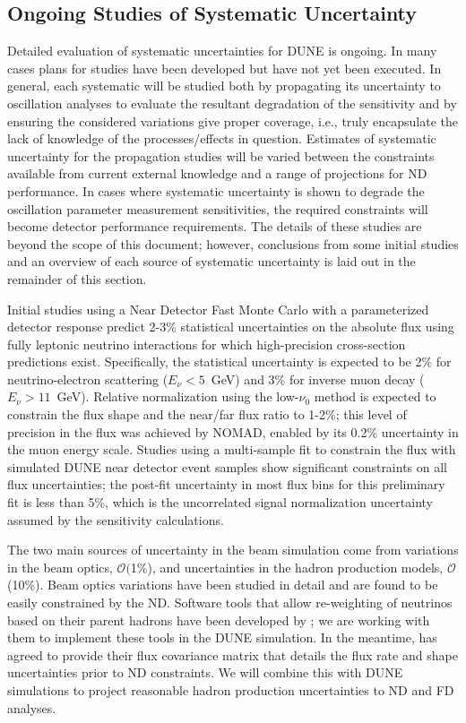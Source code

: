 \subsection{Ongoing Studies of Systematic Uncertainty}
\label{sec:syst_studies_ind}
Detailed evaluation of systematic uncertainties for DUNE is ongoing. In many cases plans for studies
have been developed but have not yet been executed. In general, each systematic will be studied both by
propagating its uncertainty to oscillation analyses to evaluate the resultant degradation of the sensitivity
and by ensuring the considered variations give proper coverage, i.e., truly encapsulate
the lack of knowledge of the processes/effects in question. Estimates of systematic uncertainty for the 
propagation studies will be varied between the constraints available from current external knowledge
and a range of projections for ND performance. In cases where systematic uncertainty is shown to
degrade the oscillation parameter
measurement sensitivities, the required constraints will become detector performance requirements.
The details of these studies are beyond the scope of this document; however, conclusions from some
initial studies and an overview of each source of systematic uncertainty is laid out in the remainder of
this section.

Initial studies using a Near Detector Fast Monte Carlo with a parameterized detector response
predict 2-3\% statistical uncertainties on the absolute flux using fully 
leptonic neutrino interactions for which high-precision cross-section predictions 
exist. Specifically,
the statistical uncertainty is expected to be 2\% for neutrino-electron
scattering ($E_\nu<5$~GeV) and 3\% for inverse muon decay ($E_\nu>11$~GeV).
Relative normalization using the low-$\nu_0$ method is
expected to constrain the flux shape and the near/far flux ratio to 1-2\%; this level of
precision in the \numu flux was achieved by NOMAD\cite{Wu:2007ab,Lyubushkin:2008pe}, enabled by its 0.2\%
uncertainty in the muon energy scale.
Studies using a multi-sample fit  to constrain the flux with simulated DUNE near detector
event samples show significant constraints on all flux
uncertainties; the post-fit uncertainty in most flux bins for this preliminary fit is less
than 5\%, which is the uncorrelated \numu signal normalization
uncertainty assumed by the sensitivity calculations. 

The two main sources of uncertainty in the beam simulation come from variations in the beam optics,
$\mathcal{O}($1\%), and uncertainties in the hadron production models, $\mathcal{O}$(10\%).
Beam optics variations have been studied in detail
and are found to be easily constrained by the ND. Software tools that
allow re-weighting of neutrinos based on their parent hadrons have been developed by \minerva; we are working with
them to implement these tools in the DUNE simulation.
In the meantime, \minerva has agreed to provide their flux covariance matrix
that details the flux rate and shape uncertainties prior to ND constraints. We will combine this with DUNE
simulations to project reasonable hadron production uncertainties to ND and FD analyses.

